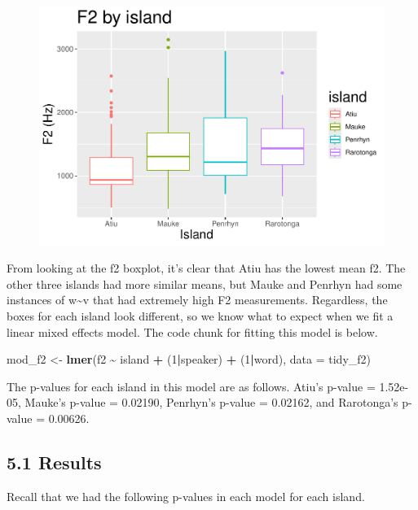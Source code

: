 \documentclass[
  ,man,floatsintext]{apa6}
\newenvironment{Shaded}{\begin{snugshade}}{\end{snugshade}}
\newcommand{\AttributeTok}[1]{\textcolor[rgb]{0.13,0.29,0.53}{#1}}
\newcommand{\DecValTok}[1]{\textcolor[rgb]{0.00,0.00,0.81}{#1}}
\newcommand{\FunctionTok}[1]{\textcolor[rgb]{0.13,0.29,0.53}{\textbf{#1}}}
\newcommand{\NormalTok}[1]{#1}
\newcommand{\OtherTok}[1]{\textcolor[rgb]{0.56,0.35,0.01}{#1}}
\newcommand{\SpecialCharTok}[1]{\textcolor[rgb]{0.81,0.36,0.00}{\textbf{#1}}}
\begin{document}
\begin{figure}

{\centering \includegraphics[width=0.75\linewidth]{D2_CIM_files/figure-latex/print-f2-plot-1} 

}

\caption{ }\label{fig:print-f2-plot}
\end{figure}

From looking at the f2 boxplot, it's clear that Atiu has the lowest mean f2. The other three islands had more similar means, but Mauke and Penrhyn had some instances of w\textasciitilde v that had extremely high F2 measurements. Regardless, the boxes for each island look different, so we know what to expect when we fit a linear mixed effects model. The code chunk for fitting this model is below.

\begin{Shaded}
\begin{Highlighting}[]
\NormalTok{mod\_f2 }\OtherTok{\textless{}{-}} \FunctionTok{lmer}\NormalTok{(f2 }\SpecialCharTok{\textasciitilde{}}\NormalTok{ island }\SpecialCharTok{+}\NormalTok{ (}\DecValTok{1}\SpecialCharTok{|}\NormalTok{speaker) }\SpecialCharTok{+}\NormalTok{ (}\DecValTok{1}\SpecialCharTok{|}\NormalTok{word), }\AttributeTok{data =}\NormalTok{ tidy\_f2)}
\end{Highlighting}
\end{Shaded}

The p-values for each island in this model are as follows. Atiu's p-value = 1.52e-05, Mauke's p-value = 0.02190, Penrhyn's p-value = 0.02162, and Rarotonga's p-value = 0.00626.

\subsection{5.1 Results}\label{results}

Recall that we had the following p-values in each model for each island.
\end{document}
